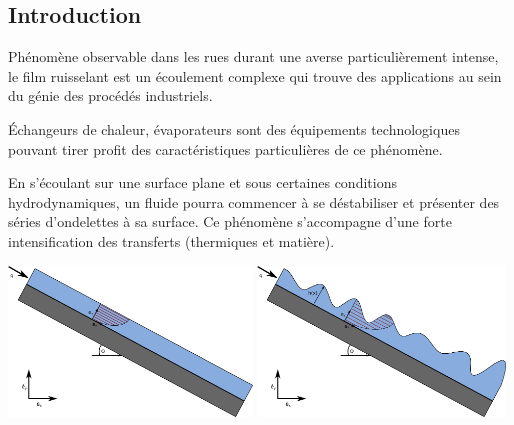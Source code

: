 \documentclass[a0,portrait]{a0poster}
\begin{document}
\vspace{1cm} %


\begin{multicols}{2}

    \color{SaddleBrown}

    \section*{Introduction}

    Phénomène observable dans les rues durant une averse particulièrement intense, le film ruisselant est un écoulement complexe qui trouve des applications au sein du génie des procédés industriels.

    Échangeurs de chaleur, évaporateurs sont des équipements technologiques pouvant tirer profit des caractéristiques particulières de ce phénomène.

    En s'écoulant sur une surface plane et sous certaines conditions hydrodynamiques, un fluide pourra commencer à se déstabiliser et présenter des séries d'ondelettes à sa surface. Ce phénomène s'accompagne d'une forte intensification des transferts (thermiques et matière).

    \begin{multicols}{2}
        \begin{center}\vspace{.2cm}
        \end{center}\vspace{.2cm}
        \columnbreak
        \begin{center}\vspace{.5cm}
        	\includegraphics[height=4cm]{thinfilm}
            \includegraphics[height=4cm]{thinfilm_unstable}
        \end{center}\vspace{.5cm}
    \end{multicols}


\end{multicols}
\end{document}
